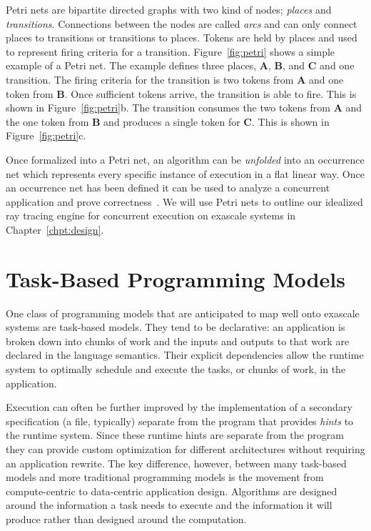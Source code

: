 Petri nets are bipartite directed graphs with two kind of nodes; \emph{places}
and \emph{transitions}.  Connections between the nodes are called \emph{arcs}
and can only connect places to transitions or transitions to places.  Tokens are
held by places and used to represent firing criteria for a transition.  
Figure~\ref{fig:petri} shows a simple example of a Petri net.  The 
example defines three places, \textbf{A}, \textbf{B}, and \textbf{C} and one
transition.  The firing criteria for the transition is two tokens from
\textbf{A} and one token from \textbf{B}.  Once sufficient tokens arrive, the
transition is able to fire.  This is shown in Figure~\ref{fig:petri}b.  The
transition consumes the two tokens from \textbf{A} and the one token from
\textbf{B} and produces a single token for \textbf{C}.  This is shown in
Figure~\ref{fig:petri}c.

Once formalized into a Petri net, an algorithm can be \emph{unfolded} into an 
occurrence net which represents every specific instance of execution in a flat
linear way.  Once an occurrence net has been defined it can be used to analyze a
concurrent application and prove correctness~\cite{phd-franco}.  We will use 
Petri nets to outline our idealized ray tracing engine for concurrent execution 
on exascale systems in Chapter~\ref{chpt:design}.  

\section{Task-Based Programming Models}
\label{sec:task-based}

One class of programming models that are anticipated to map well onto exascale 
systems are task-based models. They tend to be declarative: an application is
broken down into chunks of work and the inputs and outputs to that work are 
declared in the language semantics. Their explicit dependencies allow the 
runtime system to optimally schedule and execute the tasks, or chunks of work,
in the application.

Execution can often be further improved by the implementation of a
secondary specification (a file, typically) separate from the program
that provides \emph{hints} to the runtime system.  Since these runtime hints are
separate from the program they can provide custom optimization for different
architectures without requiring an application rewrite.  The key difference,
however, between many task-based models and more traditional programming models
is the movement from compute-centric to data-centric application design.
Algorithms are designed around the information a task needs to execute
and the information it will produce rather than designed around the computation.

